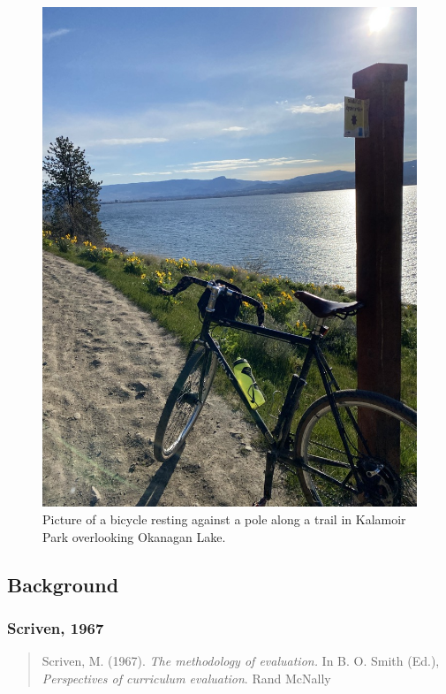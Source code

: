 \documentclass[
]{book}
\begin{document}
\begin{figure}
\centering
\includegraphics{assets/otessa22/kalamoir.jpg}
\caption{Picture of a bicycle resting against a pole along a trail in Kalamoir Park overlooking Okanagan Lake.}
\end{figure}

\hypertarget{background}{%
\subsection*{Background}\label{background}}

\hypertarget{scriven-1967}{%
\subsubsection*{Scriven, 1967}\label{scriven-1967}}

\begin{quote}
Scriven, M. (1967). \emph{The methodology of evaluation.} In B. O. Smith (Ed.), \emph{Perspectives of curriculum evaluation}. Rand McNally
\end{quote}
\end{document}
